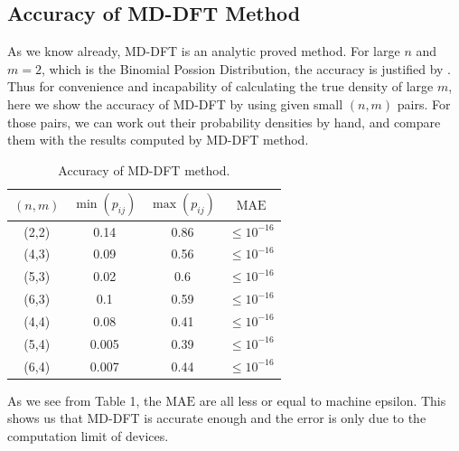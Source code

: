 \documentclass[12pt]{article}
\begin{document}
\subsection{Accuracy of MD-DFT Method}
As we know already, MD-DFT is an analytic proved method. For large $n$ and $m=2$, which is the Binomial Possion Distribution, the accuracy is justified by . Thus for convenience and incapability of calculating the true density of large $m$, here we show the accuracy of MD-DFT by using given small $(n,m)$ pairs. For those pairs, we can work out their probability densities by hand, and compare them with the results computed by MD-DFT method.
\begin{table}%
\centering
\caption{Accuracy of MD-DFT method.}\label{tab:my_label}
\vspace{1ex}
\begin{tabular}{c|c|c|c}
\hline\hline
     $(n,m)$ & $\min (p_{i j})$ & $\max (p_{i j})$ & $\mathrm{MAE}$ \\
\hline
    (2,2) & 0.14 & 0.86 & $\leq 10^{-16}$\\
\hline
    (4,3) &0.09 &0.56 & $\leq 10^{-16}$\\
\hline
    (5,3) &0.02 &0.6 &$\leq 10^{-16}$\\
\hline
    (6,3) &0.1 &0.59 &$\leq 10^{-16}$\\
\hline
    (4,4) &0.08 &0.41 &$\leq 10^{-16}$\\
\hline
    (5,4) &0.005 &0.39 &$\leq 10^{-16}$\\
\hline
    (6,4) &0.007 &0.44 &$\leq 10^{-16}$\\
\hline\hline
\end{tabular}

\end{table}
As we see from Table 1, the $\mathrm{MAE}$ are all less or equal to machine epsilon. This shows us that MD-DFT is accurate enough and the error is only due to the computation limit of devices. 
\end{document}
